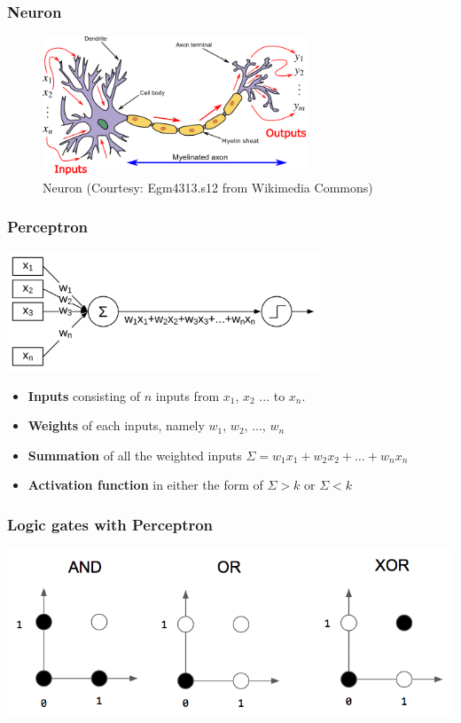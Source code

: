 \documentclass[aspectratio=169]{beamer}
\begin{document}
\begin{frame}
	\frametitle{Neuron}
	\begin{figure}
		\includegraphics[width=0.7\textwidth]{imgs/neuron.png}
		\caption{Neuron (Courtesy: Egm4313.s12 from Wikimedia Commons)}
	\end{figure}
\end{frame}

\begin{frame}
	\frametitle{Perceptron}
	\begin{center}
		\includegraphics[width=0.7\textwidth]{imgs/perceptron.pdf}
	\end{center}
	\begin{itemize}
		\item \textbf{Inputs} consisting of $n$ inputs from $x_1$, $x_2$ ... to $x_n$.
		\item \textbf{Weights} of each inputs, namely $w_1$, $w_2$, ..., $w_n$
		\item \textbf{Summation} of all the weighted inputs $\Sigma = w_1x_1 + w_2x_2 + \hdots + w_nx_n$
		\item \textbf{Activation function} in either the form of $\Sigma > k$ or  $\Sigma < k$
	\end{itemize}
\end{frame}

\begin{frame}
	\frametitle{Logic gates with Perceptron}
	\begin{center}
		\includegraphics[width=0.7\linewidth,height=0.7\textheight,keepaspectratio]{imgs/gates.png}
	\end{center}
\end{frame}
\end{document}

